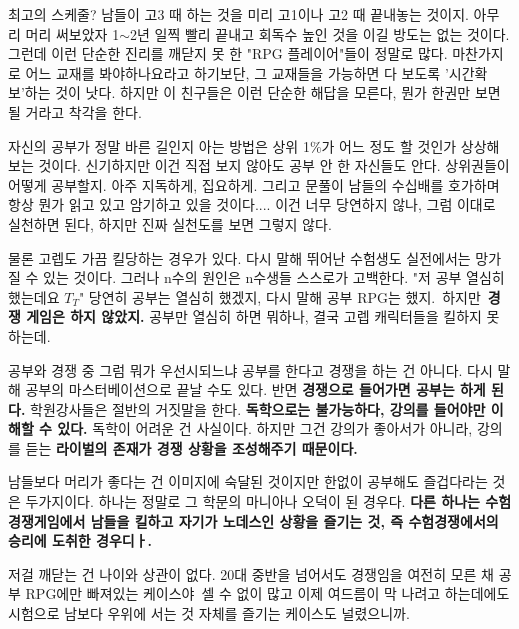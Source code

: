 최고의 스케줄? 남들이 고3 때 하는 것을 미리 고1이나 고2 때 끝내놓는 것이지.
아무리 머리 써보았자 1$\sim$2년 일찍 빨리 끝내고 회독수 높인 것을 이길 방도는 없는 것이다.
그런데 이런 단순한 진리를 깨닫지 못 한 "RPG 플레이어"들이 정말로 많다.
마찬가지로 어느 교재를 봐야하나요라고 하기보단, 그 교재들을 가능하면 다 보도록 '시간확보'하는 것이 낫다.
하지만 이 친구들은 이런 단순한 해답을 모른다, 뭔가 한권만 보면 될 거라고 착각을 한다.
\vspace{5mm}

자신의 공부가 정말 바른 길인지 아는 방법은 상위 1$\%$가 어느 정도 할 것인가 상상해보는 것이다.
신기하지만 이건 직접 보지 않아도 공부 안 한 자신들도 안다. 상위권들이 어떻게 공부할지.
아주 지독하게, 집요하게. 그리고 문풀이 남들의 수십배를 호가하며 항상 뭔가 읽고 있고 암기하고 있을 것이다....
이건 너무 당연하지 않나, 그럼 이대로 실천하면 된다, 하지만 진짜 실천도를 보면 그렇지 않다.
\vspace{5mm}

물론 고렙도 가끔 킬당하는 경우가 있다. 다시 말해 뛰어난 수험생도 실전에서는 망가질 수 있는 것이다.
그러나 n수의 원인은 n수생들 스스로가 고백한다. "저 공부 열심히 했는데요 $T_T$"
당연히 공부는 열심히 했겠지, 다시 말해 공부 RPG는 했지. 하지만 \textbf{경쟁 게임은 하지 않았지.}
공부만 열심히 하면 뭐하나, 결국 고렙 캐릭터들을 킬하지 못 하는데.
\vspace{5mm}

공부와 경쟁 중 그럼 뭐가 우선시되느냐
공부를 한다고 경쟁을 하는 건 아니다. 다시 말해 공부의 마스터베이션으로 끝날 수도 있다.
반면 \textbf{경쟁으로 들어가면 공부는 하게 된다.}
학원강사들은 절반의 거짓말을 한다. \textbf{독학으로는 불가능하다, 강의를 들어야만 이해할 수 있다.}
독학이 어려운 건 사실이다. 하지만 그건 강의가 좋아서가 아니라, 강의를 듣는 \textbf{라이벌의 존재가 경쟁 상황을 조성해주기 때문이다.}
\vspace{5mm}

남들보다 머리가 좋다는 건 이미지에 숙달된 것이지만
한없이 공부해도 즐겁다라는 것은 두가지이다.
하나는 정말로 그 학문의 마니아나 오덕이 된 경우다.
\textbf{다른 하나는 수험경쟁게임에서 남들을 킬하고 자기가 노데스인 상황을 즐기는 것, 즉 수험경쟁에서의 승리에 도취한 경우디ㅏ.}
\vspace{5mm}

저걸 깨닫는 건 나이와 상관이 없다.
20대 중반을 넘어서도 경쟁임을 여전히 모른 채 공부 RPG에만 빠져있는 케이스야 셀 수 없이 많고
이제 여드름이 막 나려고 하는데에도 시험으로 남보다 우위에 서는 것 자체를 즐기는 케이스도 널렸으니까.
\vspace{5mm}





